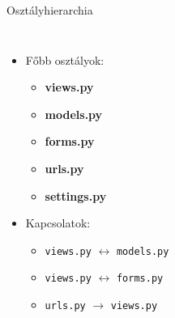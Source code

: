\documentclass[11pt]{beamer}
\begin{document}
\begin{frame}{Osztályhierarchia}
    \vspace{-2em}
    \begin{columns}[t]
        \begin{itemize}
            \item Főbb osztályok:
                \begin{itemize}
                    \vspace{0.5em}
                    \item \textbf{views.py}
                    \vspace{0.5em}
                    \item \textbf{models.py}
                    \vspace{0.5em}
                    \item \textbf{forms.py}
                    \vspace{0.5em}
                    \item \textbf{urls.py}
                    \vspace{0.5em}
                    \item \textbf{settings.py}
                \end{itemize}
            \vspace{1em}
            \item Kapcsolatok:
                \begin{itemize}
                    \vspace{0.5em}
                    \item \texttt{views.py} $\leftrightarrow$ \texttt{models.py}
                    \vspace{0.5em}
                    \item \texttt{views.py} $\leftrightarrow$ \texttt{forms.py}
                    \vspace{0.5em}
                    \item \texttt{urls.py} $\rightarrow$ \texttt{views.py}
                \end{itemize}
        \end{itemize}

\end{columns}
\end{frame}
\end{document}

